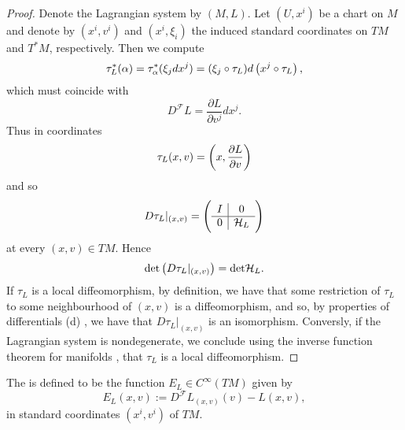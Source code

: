 \begin{proof}
	Denote the Lagrangian system by $(M,L)$. Let $(U,x^i)$ be a chart on $M$ and denote by $(x^i,v^i)$ and $(x^i,\xi_i)$ the induced standard coordinates on $TM$ and $T^*M$, respectively. Then we compute
	\begin{equation*}
		\tau^*_L(\alpha) = \tau^*_\alpha(\xi_j dx^j) = (\xi_j \circ \tau_L)d\del[1]{x^j \circ \tau_L},
	\end{equation*}
	\noindent which must coincide with
	\begin{equation*}
		D^\mathcal{F}L = \frac{\partial L}{\partial v^j}dx^j.
	\end{equation*}
	Thus in coordinates
	\begin{equation}
		\label{eq:Legendre_in_coordinates}
		\tau_L(x,v) = \del[3]{x,\frac{\partial L}{\partial v}}
	\end{equation}
	\noindent and so
	\begin{equation*}
		D\tau_L\vert_{(x,v)} = \del{\begin{array}{c|c}
			I & 0\\\hline
			0 & \mathcal{H}_L
		\end{array}}
	\end{equation*}
	\noindent at every $(x,v) \in TM$. Hence 
	\begin{equation*}
		\det \del[1]{D\tau_L\vert_{(x,v)}} = \det \mathcal{H}_L.
	\end{equation*}
	If $\tau_L$ is a local diffeomorphism, by definition, we have that some restriction of $\tau_L$ to some neighbourhood of $(x,v)$ is a diffeomorphism, and so, by properties of differentials (d) \cite[55]{lee:smooth_manifolds:2013}, we have that $D\tau_L\vert_{(x,v)}$ is an isomorphism. Conversly, if the Lagrangian system is nondegenerate, we conclude using the inverse function theorem for manifolds \cite[79]{lee:smooth_manifolds:2013}, that $\tau_L$ is a local diffeomorphism.
\end{proof}

\begin{definition}[Energy]
	\label{def:energy}
	The  is defined to be the function $E_L \in C^\infty(TM)$ given by
	\begin{equation*}
		E_L(x,v) := D^\mathcal{F}L_{(x,v)}(v) - L(x,v),
	\end{equation*}
	\noindent in standard coordinates $(x^i,v^i)$ of $TM$.
\end{definition}

